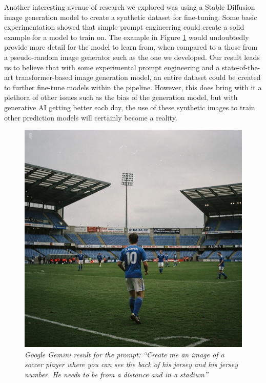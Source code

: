 \documentclass[11pt, letterpaper]{article}
\begin{document}
Another interesting avenue of research we explored was using a Stable Diffusion image generation model to create a synthetic dataset for fine-tuning. Some basic experimentation showed that simple prompt engineering could create a solid example for a model to train on. The example in Figure \ref{fig:gemini_jersey} would undoubtedly provide more detail for the model to learn from, when compared to a those from a pseudo-random image generator such as the one we developed. Our result leads us to believe that with some experimental prompt engineering and a state-of-the-art transformer-based image generation model, an entire dataset could be created to further fine-tune models within the pipeline. However, this does bring with it a plethora of other issues such as the bias of the generation model, but with generative AI getting better each day, the use of these synthetic images to train other prediction models will certainly become a reality.

\begin{figure}
  \centering
  \includegraphics[width=0.5\linewidth]{img/gemini_jersey.jpg}
  \caption{\label{fig:gemini_jersey}\textit{Google Gemini result for the prompt: “Create me an image of a soccer player where you can see the back of his jersey and his jersey number. He needs to be from a distance and in a stadium”}}
\end{figure}


\clearpage


\end{document}

